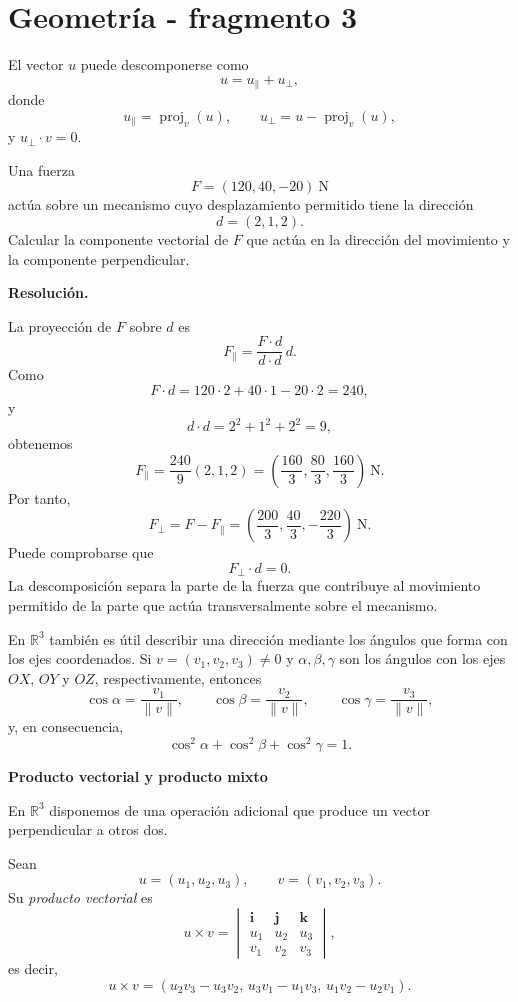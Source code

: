 \section{Geometría - fragmento 3}
El vector $u$ puede descomponerse como
\[
u=u_{\parallel}+u_{\perp},
\]
donde
\[
u_{\parallel}=\operatorname{proj}_v(u),
\qquad
u_{\perp}=u-\operatorname{proj}_v(u),
\]
y $u_{\perp}\cdot v=0$.

\begin{solvedexercise}
Una fuerza
\[
F=(120,40,-20)\ \mathrm{N}
\]
actúa sobre un mecanismo cuyo desplazamiento permitido tiene la dirección
\[
d=(2,1,2).
\]
Calcular la componente vectorial de $F$ que actúa en la dirección del movimiento y la componente perpendicular.

\textbf{Resolución.}\par\smallskip
La proyección de $F$ sobre $d$ es
\[
F_{\parallel}
=\frac{F\cdot d}{d\cdot d}\,d.
\]
Como
\[
F\cdot d=120\cdot2+40\cdot1-20\cdot2=240,
\]
y
\[
d\cdot d=2^2+1^2+2^2=9,
\]
obtenemos
\[
F_{\parallel}=\frac{240}{9}(2,1,2)
=\left(\frac{160}{3},\frac{80}{3},\frac{160}{3}\right)\ \mathrm{N}.
\]
Por tanto,
\[
F_{\perp}=F-F_{\parallel}
=\left(\frac{200}{3},\frac{40}{3},-\frac{220}{3}\right)\ \mathrm{N}.
\]
Puede comprobarse que
\[
F_{\perp}\cdot d=0.
\]
La descomposición separa la parte de la fuerza que contribuye al movimiento permitido de la parte que actúa transversalmente sobre el mecanismo.
\end{solvedexercise}

En $\mathbb{R}^3$ también es útil describir una dirección mediante los ángulos que forma con los ejes coordenados. Si $v=(v_1,v_2,v_3)\neq0$ y $\alpha,\beta,\gamma$ son los ángulos con los ejes $OX$, $OY$ y $OZ$, respectivamente, entonces
\[
\cos\alpha=\frac{v_1}{\|v\|},
\qquad
\cos\beta=\frac{v_2}{\|v\|},
\qquad
\cos\gamma=\frac{v_3}{\|v\|},
\]
y, en consecuencia,
\[
\cos^2\alpha+\cos^2\beta+\cos^2\gamma=1.
\]

\textbf{Producto vectorial y producto mixto}

En $\mathbb{R}^3$ disponemos de una operación adicional que produce un vector perpendicular a otros dos.

\begin{definition}
Sean
\[
u=(u_1,u_2,u_3),\qquad v=(v_1,v_2,v_3).
\]
Su \emph{producto vectorial} es
\[
u\times v=
\begin{vmatrix}
\mathbf i&\mathbf j&\mathbf k\\
u_1&u_2&u_3\\
v_1&v_2&v_3
\end{vmatrix},
\]
es decir,
\[
u\times v
=
(u_2v_3-u_3v_2,\,
 u_3v_1-u_1v_3,\,
 u_1v_2-u_2v_1).
\]
\end{definition}

